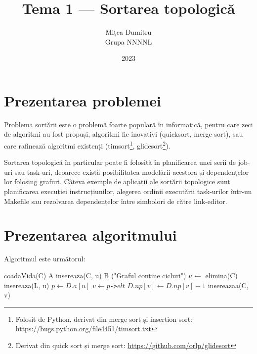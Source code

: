 \documentclass{article}
\title{Tema 1 --- Sortarea topologică}
\author{
    Mițca Dumitru\\
    Grupa NNNNL
}
\date{2023}
\begin{document}
    \maketitle

    \hypersetup{linkbordercolor=1 1 1}
    \renewcommand*\contentsname{Cuprins}
    \tableofcontents
    \hypersetup{linkbordercolor=1 0 0}

    \newpage

    \section{Prezentarea problemei}

    Problema sortării este o problemă foarte populară în informatică, pentru care zeci de algoritmi
    au fost propuși, algoritmi fie inovativi (quicksort, merge sort), sau care rafinează algoritmi
    existenți (timsort\footnote{Folosit de Python, derivat din merge sort și insertion sort:
    \url{https://bugs.python.org/file4451/timsort.txt}}, glidesort\footnote{Derivat din quick sort
    și merge sort: \url{https://github.com/orlp/glidesort}}).

    Sortarea topologică în particular poate fi folosită în planificarea unei serii de job-uri sau
    task-uri, deoarece există posibilitatea modelării acestora și dependențelor lor folosing grafuri.
    Câteva exemple de aplicații ale sortării topologice sunt planificarea execuției instrucțiunilor,
    alegerea ordinii executării task-urilor într-un Makefile sau rezolvarea dependențelor între
    simbolori de către link-editor.

    \section{Prezentarea algoritmului}

    Algoritmul este următorul:

    \begin{algorithmic}
            \State coadaVida(C)
                 \Comment A
                    \State insereaza(C, u)
                \EndIf
            \EndFor
                 \Comment B
                    \State \Return ("Graful conține cicluri")
                \EndIf
                \State $u \gets$ elimina(C)
                \State insereaza(L, u)
                \State $p \gets D.a[u]$
                    \State $v \gets p$\texttt{->}$elt$
                    \State $D.np[v] \gets D.np[v] - 1$
                        \State insereazaa(C, v)
                    \EndIf
                \EndWhile
            \EndFor
        \EndProcedure
    \end{algorithmic}
\end{document}
